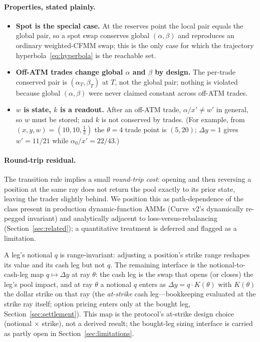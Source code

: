 \documentclass[runningheads]{llncs}
\begin{document}
\paragraph{Properties, stated plainly.}
\begin{itemize}[leftmargin=2em]
  \item \textbf{Spot is the special case.} At the reserves point the local pair
        equals the global pair, so a spot swap conserves global $(\alpha,\beta)$
        and reproduces an ordinary weighted-CFMM swap; this is the only case for
        which the trajectory hyperbola~\eqref{eq:hyperbola} is the reachable set.
  \item \textbf{Off-ATM trades change global $\alpha$ and $\beta$ by design.} The
        per-trade conserved pair is $(\alpha_T,\beta_T)$ at $T$, not the global
        pair; nothing is violated because global $(\alpha,\beta)$ were never
        claimed constant across off-ATM trades.
  \item \textbf{$w$ is state, $k$ is a readout.} After an off-ATM trade,
        $\alpha/x'\neq w'$ in general, so $w$ must be stored; and $k$ is not
        conserved by trades. (For example, from $(x,y,w)=(10,10,\tfrac12)$ the
        $\theta=4$ trade point is $(5,20)$; $\Delta y=1$ gives $w'=11/21$ while
        $\alpha_0/x'=22/43$.)
\end{itemize}

\paragraph{Round-trip residual.}
The transition rule implies a small \emph{round-trip cost}: opening and then
reversing a position at the same ray does not return the pool exactly to its prior
state, leaving the trader slightly behind. We position this as path-dependence of
the class present in production dynamic-function AMMs (Curve~v2's dynamically
re-pegged invariant) and analytically adjacent to loss-versus-rebalancing
(Section~\ref{sec:related}); a quantitative treatment is deferred and flagged as a
limitation.

A leg's notional $q$ is range-invariant: adjusting a position's strike range
reshapes its value and its cash leg but not $q$. The remaining interface is the
notional-to-cash-leg map $q\mapsto\Delta y$ at ray $\theta$: the cash leg is the
swap that opens (or closes) the leg's pool impact, and at ray $\theta$ a notional
$q$ enters as $\Delta y=q\cdot K(\theta)$ with $K(\theta)$ the dollar strike on
that ray (the \emph{at-strike} cash leg---bookkeeping evaluated at the strike ray
itself; option pricing enters only at the bought leg,
Section~\ref{sec:settlement}). This map is the protocol's at-strike
design choice (notional $\times$ strike), not a derived result; the bought-leg
sizing interface is carried as partly open in Section~\ref{sec:limitations}.
\end{document}
